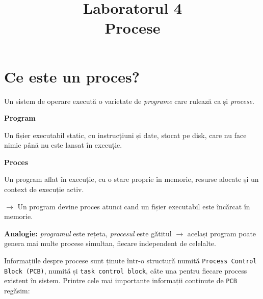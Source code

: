 \documentclass[12pt,a4paper]{article}
\title{Laboratorul 4 \\ Procese}
\date{}
\begin{document}
\maketitle

\vspace{-40pt}

\section{Ce este un proces?}

Un sistem de operare execută o varietate de \textit{programe} 
care rulează ca și \textit{procese}.

\begin{center}
  \begin{minipage}{0.45\textwidth}
    \begin{mdframed}[linecolor=gray, linewidth=0.5pt, backgroundcolor=gray!7,
      innertopmargin=8pt, innerbottommargin=8pt]
      \centering
      \textbf{Program} \\[6pt]
      \raggedright
      Un fișier executabil static, cu instrucțiuni și date, 
      stocat pe disk, care nu face nimic până nu este lansat în execuție.
    \end{mdframed}
  \end{minipage}
  \hfill
  \begin{minipage}{0.45\textwidth}
    \begin{mdframed}[linecolor=gray, linewidth=0.5pt, backgroundcolor=gray!7,
      innertopmargin=8pt, innerbottommargin=8pt]
      \centering
      \textbf{Proces} \\[6pt]
      \raggedright
      Un program aflat în execuție, cu o stare proprie în memorie, resurse
      alocate și un context de execuție activ.
    \end{mdframed}
  \end{minipage}
\end{center}

$\rightarrow$ Un program devine proces atunci cand 
un fișier executabil este încărcat în memorie.

\medskip
\textbf{Analogie:} \textit{programul} este rețeta, 
\textit{procesul} este gătitul $\rightarrow$ 
același program poate genera mai multe procese simultan, 
fiecare independent de celelalte.
\medskip

Informațiile despre procese sunt ținute într-o structură numită 
\texttt{Process Control Block (PCB)}, numită și \texttt{task control block},
câte una pentru fiecare process existent în sistem. 
Printre cele mai importante informații 
conținute de \texttt{PCB} regăsim:
\end{document}
